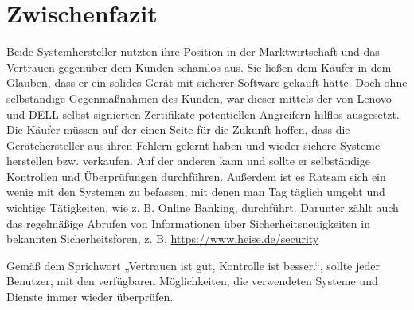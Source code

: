 \section{Zwischenfazit}
Beide Systemhersteller nutzten ihre Position in der Marktwirtschaft und das Vertrauen gegenüber dem Kunden schamlos aus. Sie ließen dem Käufer in dem Glauben, dass er ein solides Gerät mit sicherer Software gekauft hätte. Doch ohne selbständige Gegenmaßnahmen des Kunden, war dieser mittels der von Lenovo und DELL selbst signierten Zertifikate potentiellen Angreifern hilflos ausgesetzt. Die Käufer müssen auf der einen Seite für die Zukunft hoffen, dass die Gerätehersteller aus ihren Fehlern gelernt haben und wieder sichere Systeme herstellen bzw. verkaufen. Auf der anderen kann und sollte er selbständige Kontrollen und Überprüfungen durchführen. Außerdem ist es Ratsam sich ein wenig mit den Systemen zu befassen, mit denen man Tag täglich umgeht und wichtige Tätigkeiten, wie z. B. Online Banking, durchführt. Darunter zählt auch das regelmäßige Abrufen von Informationen über Sicherheitsneuigkeiten in bekannten Sicherheitsforen, z. B. \url{https://www.heise.de/security}

Gemäß dem Sprichwort „Vertrauen ist gut, Kontrolle ist besser.“, sollte jeder Benutzer, mit den verfügbaren Möglichkeiten, die verwendeten Systeme und Dienste immer wieder überprüfen.